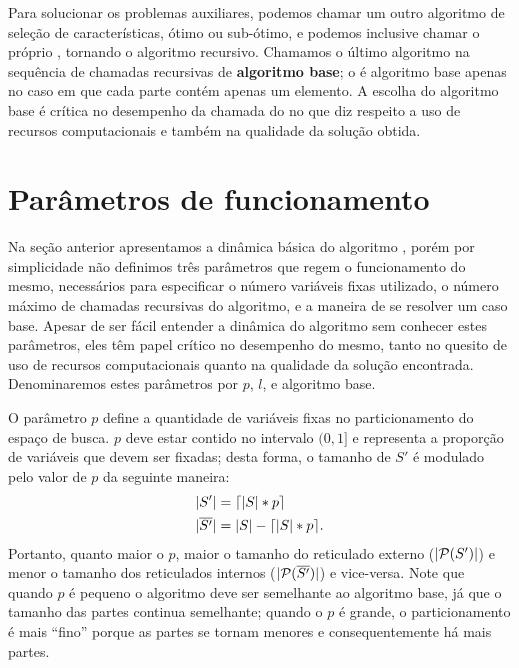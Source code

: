 Para solucionar os problemas auxiliares, podemos chamar um outro 
algoritmo de seleção de características, ótimo ou sub-ótimo, e podemos 
inclusive chamar o próprio , tornando o algoritmo 
recursivo. Chamamos o último algoritmo na sequência de chamadas 
recursivas de {\bf algoritmo base}; o  é algoritmo base 
apenas no caso em que cada parte contém apenas um elemento. A escolha do
algoritmo base é crítica no desempenho da chamada do  
no que diz respeito a uso de recursos computacionais e também na 
qualidade da solução obtida.

\section{Parâmetros de funcionamento}
Na seção anterior apresentamos a dinâmica básica do algoritmo 
, porém por simplicidade não definimos três parâmetros 
que regem o funcionamento do mesmo, necessários para especificar o número variáveis fixas utilizado, o número máximo de chamadas recursivas do algoritmo, e a maneira de se resolver um caso base. Apesar de ser fácil entender a 
dinâmica do algoritmo sem conhecer estes parâmetros, eles têm papel 
crítico no desempenho do mesmo, tanto no quesito de uso de recursos 
computacionais quanto na qualidade da solução encontrada. Denominaremos estes 
parâmetros por $p$, $l$, e algoritmo base.

O parâmetro $p$ define a quantidade de variáveis fixas no 
particionamento do espaço de busca. $p$ deve estar contido no intervalo 
$(0, 1]$ e representa a proporção de variáveis que devem ser fixadas; desta 
forma, o tamanho de $S'$ é modulado pelo valor de $p$ da seguinte maneira:
\begin{subequations}
\begin{align}
    |S'| & =  \lceil |S| * p \rceil \nonumber \\
    |\overline{S'}| & = |S| - \lceil |S| * p \rceil. \nonumber
\end{align}
\end{subequations}
Portanto, quanto maior o $p$, maior o tamanho do reticulado externo 
($|\mathcal{P} (S')|$) e menor o tamanho dos reticulados internos 
($|\mathcal{P}(\overline{S'})|$) e vice-versa. Note que quando $p$ é 
pequeno o algoritmo  deve ser semelhante ao algoritmo 
base, já que o tamanho das partes continua semelhante; quando o $p$ é
grande, o particionamento é mais ``fino'' porque as partes se tornam 
menores e consequentemente há mais partes.

